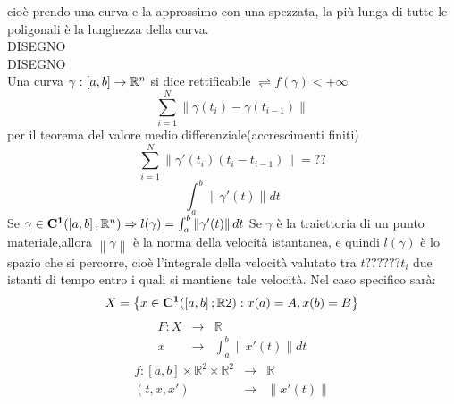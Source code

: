 cioè prendo una curva e la approssimo con una spezzata, la più lunga di tutte le poligonali è la lunghezza della curva.\\
DISEGNO\\
DISEGNO\\
Una curva $\gamma:\left[a,b\right]\to\mathbb{R}^n$ si dice rettificabile $\rightleftharpoons f(\gamma)<+\infty$
\observation
$$\sum\limits_{i=1}^{N}\left\| \gamma(t_i)-\gamma(t_{i-1}) \right\| $$
per il teorema del valore medio differenziale(accrescimenti finiti)
$$\sum\limits_{i=1}^{N}\left\|  \gamma'(t_i)(t_i-t_{i-1})\right\| =??$$
$$\int_{a}^{b}\left\|  \gamma'(t) \right\| dt$$
\proposition
Se $\gamma\in \mathbf{C^{1}}(\left[a,b\right];\mathbb{R}^n)\Rightarrow l(\gamma)=\int_a^b\left\| \gamma'(t)\right\|dt$
\observation
Se $\gamma$ è la traiettoria di un punto materiale,allora $\left\|\gamma\right\|$ è la norma della velocità istantanea, e quindi $l(\gamma)$ è lo spazio che si percorre, cioè l'integrale della velocità valutato tra $t??????t_i$ due istanti di tempo entro i quali si mantiene tale velocità.
\observation
Nel caso specifico sarà:
$$ X=\left\{ x\in \mathbf{C^{1}}(\left[a,b\right];\mathbb{R}2): x(a)=A, x(b)=B \right\} $$
$$\begin{array}{ccc} 
F: X & \to & \mathbb{R} \\
x & \to & \int_{a}^b \left\| x'(t)\right\|dt
\end{array}$$
$$\begin{array}{ccc} 
f: \left[a,b\right]\times\mathbb{R}^2\times\mathbb{R}^2 & \to & \mathbb{R} \\
(t,x, x') & \to &  \left\| x'(t)\right\|
\end{array}$$
